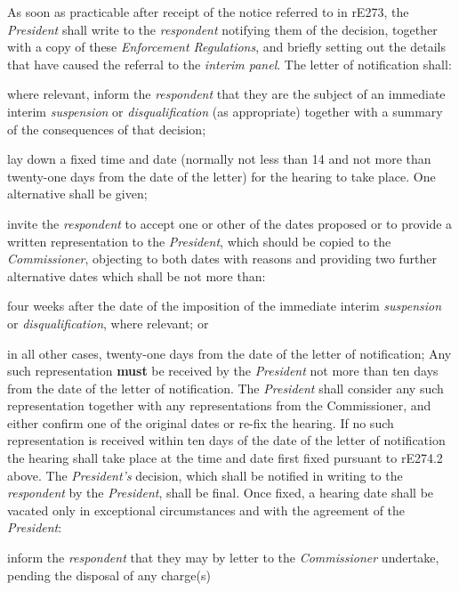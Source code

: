 \par
As soon as practicable after receipt of the notice referred to in rE273,
the \emph{President} shall write to the \emph{respondent} notifying them
of the decision, together with a copy of these \emph{Enforcement
Regulations}, and briefly setting out the details that have caused the
referral to the \emph{interim panel}. The letter of notification
shall:\\\nl \item where relevant, inform the \emph{respondent} that they are the
subject of an immediate
interim \emph{suspension} or \emph{disqualification} (as appropriate)
together with a summary of the consequences of that decision;\item lay down a fixed time and date (normally not less than 14 and not
more than twenty-one days from the date of the letter) for the hearing
to take place. One alternative shall be given;\item invite the \emph{respondent} to accept one or other of the dates
proposed or to provide a written\emph{ }representation to
the \emph{President}, which should be copied to the \emph{Commissioner},
objecting to both dates with reasons and providing two further
alternative dates which shall be not more than:\al
\item  four weeks after the date of the imposition of the immediate
interim \emph{suspension} or \emph{disqualification}, where relevant;
or\\
\item in all other cases, twenty-one days from the date of the letter of
notification;\la
Any such representation  \textcolor{myred}{\textbf{must}} be received by the \emph{President} not
more than ten days from the date of the letter of notification.
The \emph{President} shall consider any such representation together
with any representations from the Commissioner, and either confirm one
of the original dates or re-fix the hearing. If no such representation
is received within ten days of the date of the letter of notification
the hearing shall take place at the time and date first fixed pursuant
to rE274.2 above. The \emph{President's} decision, which shall be
notified in writing to the \emph{respondent} by the \emph{President},
shall be final. Once fixed, a hearing date shall be vacated only in
exceptional circumstances and with the agreement of
the \emph{President}:
\item inform the \emph{respondent} that they may by letter to
the \emph{Commissioner} undertake, pending the disposal of any charge(s)
